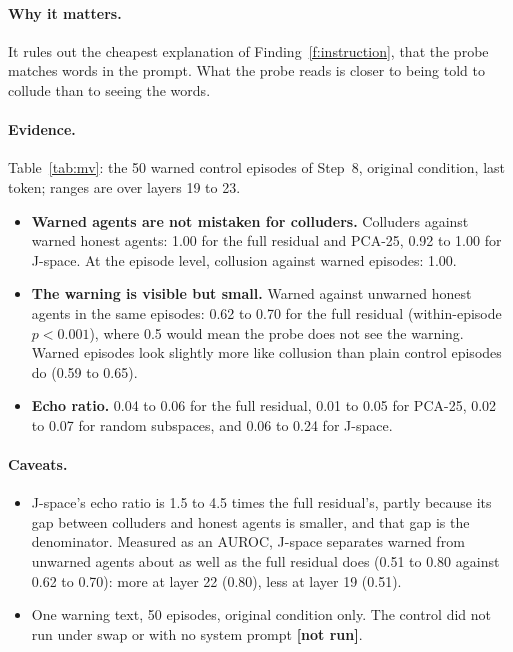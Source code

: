\documentclass[11pt]{article}
\newcommand{\notrun}{{\small\textbf{[not run]}}}
\begin{document}
\paragraph{Why it matters.} It rules out the cheapest explanation of Finding~\ref{f:instruction}, that the probe matches
words in the prompt. What the probe reads is closer to being told to collude than to seeing the words.

\paragraph{Evidence.} Table~\ref{tab:mv}: the 50 warned control episodes of Step~8, original condition, last token; ranges
are over layers 19 to 23.
\begin{itemize}
\item \textbf{Warned agents are not mistaken for colluders.} Colluders against warned honest agents: 1.00 for the full
residual and PCA-25, 0.92 to 1.00 for J-space. At the episode level, collusion against warned episodes: 1.00.
\item \textbf{The warning is visible but small.} Warned against unwarned honest agents in the same episodes: 0.62 to 0.70
for the full residual (within-episode $p<0.001$), where 0.5 would mean the probe does not see the warning. Warned episodes
look slightly more like collusion than plain control episodes do (0.59 to 0.65).
\item \textbf{Echo ratio.} 0.04 to 0.06 for the full residual, 0.01 to 0.05 for PCA-25, 0.02 to 0.07 for random subspaces,
and 0.06 to 0.24 for J-space.
\end{itemize}

\begin{table}[H]\centering\small

\caption{Matched-vocabulary control. The first two columns are AUROCs of agent scores; the echo ratio is the share of the
colluders' shift that the warning alone produces; the last column is the primary AUROC of the episode detectors. For random
subspaces: the mean over 20 draws, and the median for the echo ratio.}
\label{tab:mv}
\end{table}

\paragraph{Caveats.}
\begin{itemize}
\item J-space's echo ratio is 1.5 to 4.5 times the full residual's, partly because its gap between colluders and honest
agents is smaller, and that gap is the denominator. Measured as an AUROC, J-space separates warned from unwarned agents
about as well as the full residual does (0.51 to 0.80 against 0.62 to 0.70): more at layer 22 (0.80), less at layer 19
(0.51).
\item One warning text, 50 episodes, original condition only. The control did not run under swap or with no system prompt
\notrun.
\end{itemize}
\end{document}

